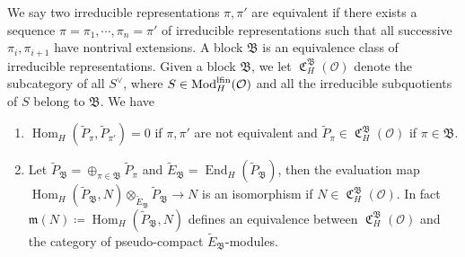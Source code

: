 \documentclass[leqno]{amsart}
\theoremstyle{definition}
\theoremstyle{remark}
\newcommand{\oo}{\mathcal{O}}
\DeclareMathOperator{\End}{End}
\DeclareMathOperator{\Hom}{Hom}
\newcommand{\fm}{\mathfrak{m}}
\DeclareMathOperator{\Mod}{\textnormal{Mod}}
\DeclareMathOperator{\fC}{\mathfrak{C}} %
\newcommand{\B}{\mathfrak B} %
\newcommand{\lfin}{\textnormal{lfin}}
\begin{document}
We say two irreducible representations $\pi,\pi'$ 
are equivalent if there exists a sequence 
$\pi=\pi_1,\cdots, \pi_n=\pi'$ of irreducible representations
such that all successive $\pi_i,\pi_{i+1}$ have nontrival extensions.
A block $\B$ is an equivalence class of irreducible representations.
Given a block $\B$, we let $\fC^\B_H(\oo)$ denote the subcategory
of all $S^\vee$, where $S\in \Mod^{\lfin}_H(\oo)$ and
all the irreducible subquotients of $S$ belong to $\B$. We have
\begin{enumerate}[label=(P\arabic*)]
\item $\Hom_H(\tilde{P}_\pi,\tilde{P}_{\pi'})=0$ if 
$\pi,\pi'$ are not equivalent and 
$\tilde{P}_\pi\in \fC^\B_H(\oo)$ if $\pi\in\B$.
\item Let $\tilde{P}_\B=\oplus_{\pi\in\B}\tilde{P}_\pi$
and $\tilde{E}_\B=\End_H(\tilde{P}_\B)$,
then the evaluation map 
$\Hom_H(\tilde{P}_\B,N)\otimes_{\tilde{E}_\B}\tilde{P}_\B\to N$
is an isomorphism if $N\in \fC^\B_H(\oo)$.
In fact $\fm(N)\coloneqq \Hom_H(\tilde{P}_\B,N)$ defines an
equivalence between $\fC^\B_H(\oo)$ and the category of pseudo-compact
$\tilde{E}_\B$-modules.
\label{P2}
\end{enumerate}
\end{document}
